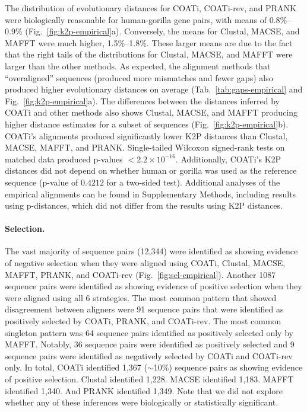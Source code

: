 \documentclass[12pt,letterpaper]{article}
\begin{document}
The distribution of evolutionary distances for COATi, COATi-rev, and PRANK were biologically reasonable for human-gorilla gene pairs, with means of 0.8\%--0.9\% (Fig.~\ref{fig:k2p-empirical}a). Conversely, the means for Clustal\textOmega{}, MACSE, and MAFFT were much higher, 1.5\%--1.8\%. These larger means are due to the fact that the right tails of the distributions for Clustal\textOmega{}, MACSE, and MAFFT were larger than the other methods. As expected, the alignment methods that ``overaligned'' sequences (produced more mismatches and fewer gaps) also produced higher evolutionary distances on average (Tab.~\ref{tab:gaps-empirical} and Fig.~\ref{fig:k2p-empirical}a). The differences between the distances inferred by COATi and other methods also shows Clustal\textOmega{}, MACSE, and MAFFT producing higher distance estimates for a subset of sequences (Fig.~\ref{fig:k2p-empirical}b).
%
COATi's alignments produced significantly lower K2P distances than Clustal\textOmega{}, MACSE, MAFFT, and PRANK. Single-tailed Wilcoxon signed-rank tests on matched data produced p-values $< 2.2\times10^{-16}$. Additionally, COATi's K2P distances did not depend on whether human or gorilla was used as the reference sequence (p-value of $0.4212$ for a two-sided test). Additional analyses of the empirical alignments can be found in Supplementary Methods, including results using p-distances, which did not differ from the results using K2P distances.


\paragraph{Selection.}

The vast majority of sequence pairs (12,344) were identified as showing evidence of negative selection when they were aligned using COATi, Clustal\textOmega{}, MACSE, MAFFT, PRANK, and COATi-rev (Fig.~\ref{fig:sel-empirical}). Another 1087 sequence pairs were identified as showing evidence of positive selection when they were aligned using all 6 strategies. The most common pattern that showed disagreement between aligners were 91 sequence pairs that were identified as positively selected by COATi, PRANK, and COATi-rev. The most common singleton pattern was 64 sequence pairs identified as positively selected only by MAFFT. Notably, 36 sequence pairs were identified as positively selected and 9 sequence pairs were identified as negatively selected by COATi and COATi-rev only.
%
In total, COATi identified 1,367 ($\sim$10\%) sequence pairs as showing evidence of positive selection. Clustal\textOmega{} identified 1,228. MACSE identified 1,183. MAFFT identified 1,340. And PRANK identified 1,349. Note that we did not explore whether any of these inferences were biologically or statistically significant.
\end{document}
